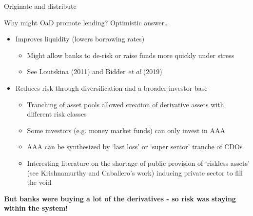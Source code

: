 \begin{frame}{Originate and distribute}

Why might OaD promote lending? Optimistic answer\ldots
	\begin{itemize}
	\item	Improves liquidity (lowers borrowing rates)
		\begin{itemize}
		\item	Might allow banks to de-risk or raise funds more quickly under stress
		\item	See Loutskina (2011) and Bidder \emph{et al} (2019)
		\end{itemize}
	\vspace{2mm}
	\item	Reduces risk through diversification and a broader investor base
		\begin{itemize}
		\item	Tranching of asset pools allowed creation of derivative assets with different risk classes
		\item	Some investors (e.g. money market funds) can only invest in AAA
		\item	AAA can be synthesized by `last loss' or `super senior' tranche of CDOs
		\item	Interesting literature on the shortage of public provision of `riskless assets' (see Krishnamurthy and Caballero's work) inducing private sector to fill the void
		\end{itemize}
	\end{itemize}
\vspace{2mm}
\textbf{But banks were buying a lot of the derivatives - so risk was staying within the system!}
\end{frame}





